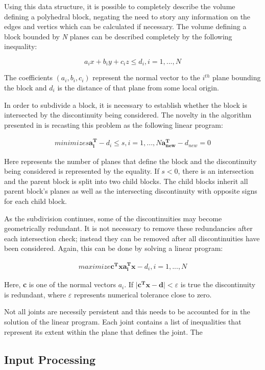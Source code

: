 Using this data structure, it is possible to completely describe the volume defining a polyhedral block, negating the need to story any information on the edges and vertics which can be calculated if necessary. The volume defining a block bounded by \textit{N} planes can be described completely by the following inequality:

\begin{equation}
a_ix + b_iy + c_iz \leq d_i, i = 1,...,N 
\end{equation}

The coefficients $(a_i, b_i, c_i)$ represent the normal vector to the $i^{th}$ plane bounding the block and $d_i$ is the distance of that plane from some local origin. \par
 
In order to subdivide a block, it is necessary to establish whether the block is intersected by the discontinuity being considered. The novelty in the algorithm presented in \cite{slicing} is recasting this problem as the following linear program: \par

\begin{align} 
minimize s
\boldsymbol{a_{i}^{T}} - d_i \leq s, i = 1,...,N
\boldsymbol{a_{new}^{T}} - d_{new} = 0
\end{align}

Here  represents the number of planes that define the block and the discontinuity being considered is represented by the equality. If $s < 0$, there is an intersection and the parent block is split into two child blocks. The child blocks inherit all parent block's planes as well as the intersecting discontinuity with opposite signs for each child block. \par

As the subdivision continues, some of the discontinuities may become geometrically redundant. It is not necessary to remove these redundancies after each intersection check; instead they can be removed after all discontinuities have been considered. Again, this can be done by solving a linear program: \par

\begin{align}
maximize \boldsymbol{c^{T} x}
\boldsymbol{a_{i}^{T} x} - d_{i}, i = 1,...,N
\end{align}

Here, \textbf{c} is one of the normal vectors $a_{i}$. If $\vert \boldsymbol{c^{T} x - d} \vert < \varepsilon$ is true the discontinuity is redundant, where $\varepsilon$ represents numerical tolerance close to zero. \par

Not all joints are necessily persistent and this needs to be accounted for in the solution of the linear program. Each joint contains a list of inequalities that represent its extent within the plane that defines the joint. The 



\subsection{Input Processing}
